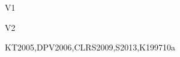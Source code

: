 \begin{syllabus}
\begin{competences}{V1}
    \item {} 
    \item {} 
    \item {} 
    \item {} 
    \item {} 
    \item {} 
\end{competences}

\begin{competences}{V2}
    \item {} 
    \item {} 
    \item {} 
    \item {} 
    \item {} 
    \item {} 
\end{competences}

\begin{unit}{\ALBasicAnalysis}{}{KT2005,DPV2006,CLRS2009,S2013,K1997}{10}{a}
\begin{topics}%
	\item \ALBasicAnalysisTopicDifferences\xspace
	\item \ALBasicAnalysisTopicAsymptotic\xspace
	\item \ALBasicAnalysisTopicBig\xspace
	\item \ALBasicAnalysisTopicComplexity\xspace
	\item \ALBasicAnalysisTopicEmpirical\xspace
	\item \ALBasicAnalysisTopicTime\xspace
    \item \ALBasicAnalysisTopicBigO\xspace
	\item \ALBasicAnalysisTopicLittle\xspace
	\item \ALBasicAnalysisTopicRecurrence\xspace
	\item \ALBasicAnalysisTopicAnalysis\xspace
	\item \ALBasicAnalysisTopicSome\xspace
\end{topics}


\end{unit}
\end{syllabus}
